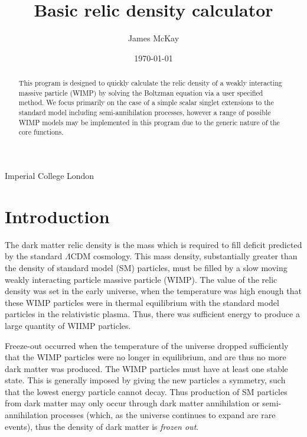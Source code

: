 



\title{Basic relic density calculator}
%
\author
{
  James McKay
}
%
%
\institute
{
  Imperial College London\label{addr1}
}
%
\date{\today}

\maketitle

\begin{abstract}
This program is designed to quickly calculate the relic density of a weakly interacting massive particle (WIMP) by solving the Boltzman equation via a user specified method.  We focus primarily on the case of a simple scalar singlet extensions to the standard model including semi-annihilation processes, however a range of possible WIMP models may be implemented in this program due to the generic nature of the core functions.
\end{abstract}

\tableofcontents

\section{Introduction}

The dark matter relic density is the mass which is required to fill deficit predicted by the standard $\Lambda$CDM cosmology.  This mass density, substantially greater than the density of standard model (SM) particles, must be filled by a slow moving weakly interacting particle massive particle (WIMP).  The value of the relic density was set in the early universe, when the temperature was high enough that these WIMP particles were in thermal equilibrium with the standard model particles in the relativistic plasma.  Thus, there was sufficient energy to produce a large quantity of WIIMP particles.

Freeze-out occurred when the temperature of the universe dropped sufficiently that the WIMP particles were no longer in equilibrium, and are thus no more dark matter was produced.  The WIMP particles must have at least one stable state.  This is generally imposed by giving the new particles a symmetry, such that the lowest energy particle cannot decay.  Thus production of SM particles from dark matter may only occur through dark matter annihilation or semi-annihilation processes (which, as the universe continues to expand are rare events), thus the density of dark matter is \textit{frozen out}.



